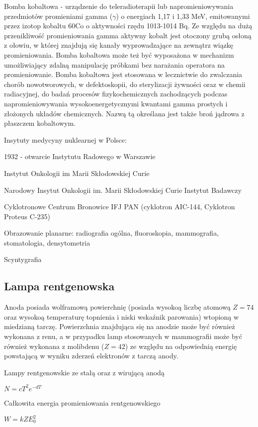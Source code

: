 \documentclass{article}
\begin{document}
Bomba kobaltowa - urządzenie do teleradioterapii lub napromieniowywania przedmiotów promieniami gamma ($\gamma$) o energiach 1,17 i 1,33 MeV, emitowanymi przez izotop kobaltu 60Co o aktywności rzędu 1013-1014 Bq. Ze względu na dużą przenikliwość promieniowania gamma aktywny kobalt jest otoczony grubą osłoną z ołowiu, w której znajdują się kanały wyprowadzające na zewnątrz wiązkę promieniowania. Bomba kobaltowa może też być wyposażona w mechanizm umożliwiający zdalną manipulację próbkami bez narażania operatora na promieniowanie. Bomba kobaltowa jest stosowana w lecznictwie do zwalczania chorób nowotworowych, w defektoskopii, do sterylizacji żywności oraz w chemii radiacyjnej, do badań procesów fizykochemicznych zachodzących podczas napromieniowywania wysokoenergetycznymi kwantami gamma prostych i złożonych układów chemicznych. Nazwą tą określana jest także broń jądrowa z płaszczem kobaltowym.

Insytuty medycyny nuklearnej w Polsce:

1932 - otwarcie Instytutu Radowego w Warszawie

Instytut Onkologii im Marii Skłodowskiej Curie

Narodowy Insytut Onkologii im. Marii Skłodowskiej Curie Instytut Badawczy

Cyklotronowe Centrum Bronowice IFJ PAN (cyklotron AIC-144, Cyklotron Proteus C-235)

Obrazowanie planarne: radiografia ogólna, fluoroskopia, mammografia, stomatologia, densytometria

Scyntygrafia

\subsection{Lampa rentgenowska}

Anoda posiada wolframową powierchnię (posiada wysokoą liczbę atomową $Z = 74$ oraz wysokoą temperaturę topnienia i niski wskaźnik parowania) wtopioną w miedzianą tarczę. Powierzchnia znajdująca się na anodzie może być również wykonana z renu, a w przypadku lamp stosowanych w mammografii może być również wykonana z molibdenu ($Z=42$) ze względu na odpowiednią energię powstającą w wyniku zderzeń elektronów z tarczą anody.

Lampy rentgenowskie ze stałą oraz z wirującą anodą

$N = cT^2e^{-dT}$

Całkowita energia promieniowania rentgenowskiego

$W = kZE_0^2$
\end{document}
